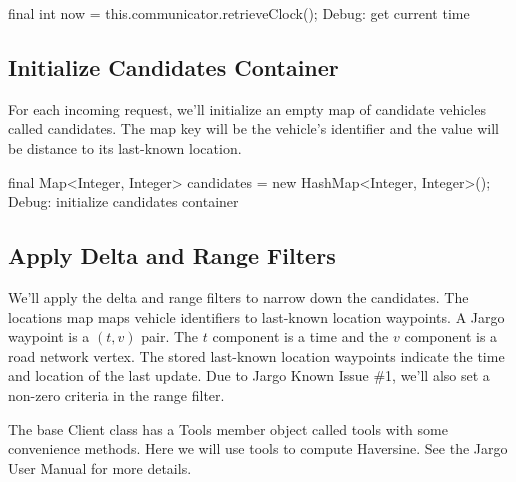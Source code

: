 \nwenddocs{}\endmoddef\nwstartdeflinemarkup{}\nwenddeflinemarkup
final int now = this.communicator.retrieveClock();
\LA{}Debug: get current time~{\nwtagstyle{}}\RA{}
\nwendcode{}\nwdocspar

\subsection{Initialize Candidates Container}

For each incoming request, we'll initialize an empty map of candidate vehicles
called {\Tt{}candidates\nwendquote}. The map key will be the vehicle's identifier and the
value will be distance to its last-known location.

\nwenddocs{}\endmoddef\nwstartdeflinemarkup{}\nwenddeflinemarkup
final Map<Integer, Integer> candidates = new HashMap<Integer, Integer>();
\LA{}Debug: initialize candidates container~{\nwtagstyle{}}\RA{}
\nwendcode{}\nwdocspar

\subsection{Apply Delta and Range Filters}

We'll apply the delta and range filters to narrow down the candidates. The
{\Tt{}locations\nwendquote} map maps vehicle identifiers to last-known location waypoints. A
Jargo waypoint is a $(t,v)$ pair. The $t$ component is a time and the $v$
component is a road network vertex. The stored last-known location waypoints
indicate the time and location of the last update. Due to Jargo Known Issue \#1,
we'll also set a non-zero criteria in the range filter.

The base {\Tt{}Client\nwendquote} class has a {\Tt{}Tools\nwendquote} member object called {\Tt{}tools\nwendquote} with
some convenience methods. Here we will use {\Tt{}tools\nwendquote} to compute Haversine.  See
the Jargo User Manual for more details.

